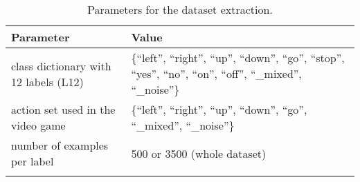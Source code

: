 \begin{table}[ht!]
\small
\begin{center}
\caption{Parameters for the dataset extraction.}
\begin{tabular}{ M{7cm}  M{6cm}}
\toprule
\textbf{Parameter} & \textbf{Value} \\
\midrule
class dictionary with 12 labels (L12) & \{\enquote{left},  \enquote{right}, \enquote{up}, \enquote{down}, \enquote{go}, \enquote{stop}, \enquote{yes}, \enquote{no}, \enquote{on}, \enquote{off}, \enquote{\_mixed}, \enquote{\_noise}\}\\
action set used in the video game & \{\enquote{left},  \enquote{right}, \enquote{up}, \enquote{down}, \enquote{go}, \enquote{\_mixed}, \enquote{\_noise}\}\\
\midrule
number of examples per label & 500 or 3500 (whole dataset) \\ 
\bottomrule
\label{tab:exp_details_params_dataset}
\end{tabular}
\end{center}
\vspace{-4mm}
\end{table}
\FloatBarrier
\noindent